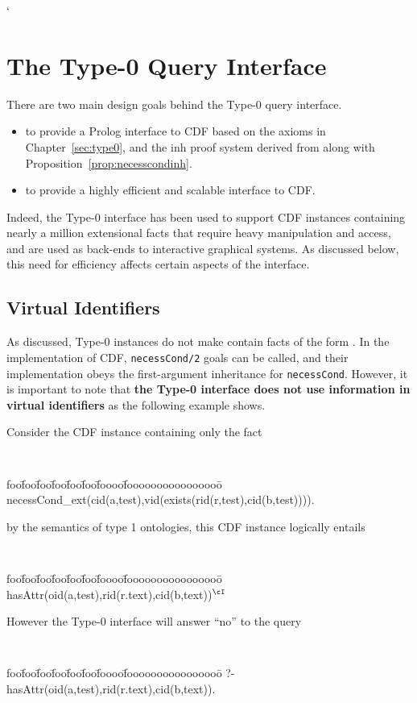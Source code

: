 `\section{The Type-0 Query Interface} \label{sec:type0query}

There are two main design goals behind the Type-0 query interface.
\begin{itemize}
\item to provide a Prolog interface to CDF based on  
the axioms in Chapter~\ref{sec:type0}, and the {\sc inh} proof system
derived from  along with
Proposition~\ref{prop:necesscondinh}.
\item to provide a highly efficient and scalable interface to CDF.
\end{itemize}

Indeed, the Type-0 interface has been used to support CDF instances
containing nearly a million extensional facts that require heavy
manipulation and access, and are used as back-ends to interactive
graphical systems.  As discussed below, this need for efficiency
affects certain aspects of the interface.

\subsection{Virtual Identifiers}
As discussed, Type-0 instances do not make contain facts of the form
.  In the implementation of CDF, {\tt necessCond/2}
goals can be called, and their implementation obeys the first-argument
inheritance for {\tt necessCond}.  However, it is important to note
that {\bf the Type-0 interface does not use information in virtual
identifiers} as the following example shows.

\begin{example} \rm 
Consider the CDF instance containing only the fact
{\small 
{\tt 
\begin{tabbing}
foo\=foo\=foo\=foo\=foo\=foo\=foooo\=foooooooooooooooo\=\kill
\> necessCond\_ext(cid(a,test),vid(exists(rid(r,test),cid(b,test)))).
\end{tabbing} } } 
%
\noindent
by the semantics of type 1 ontologies, this CDF instance logically
entails {\small {\tt
\begin{tabbing}
foo\=foo\=foo\=foo\=foo\=foo\=foooo\=foooooooooooooooo\=\kill
\> hasAttr(oid(a,test),rid(r.text),cid(b,text))$^{\cI}$
\end{tabbing} } } 
%
\noindent
However the Type-0 interface will answer ``no'' to the query 
{\small 
{\tt 
\begin{tabbing}
foo\=foo\=foo\=foo\=foo\=foo\=foooo\=foooooooooooooooo\=\kill
\> ?- hasAttr(oid(a,test),rid(r.text),cid(b,text)).
\end{tabbing} } } 
%
\end{example}

